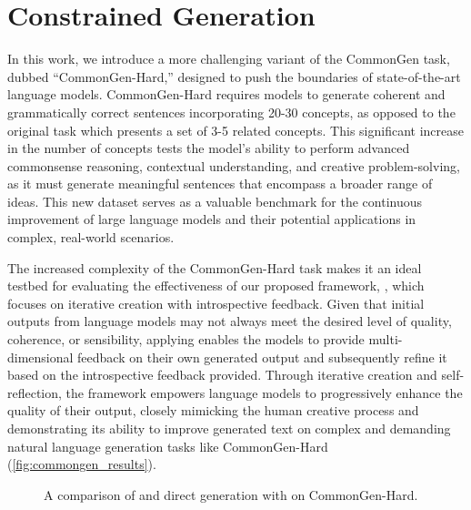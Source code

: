 \section{Constrained Generation}
\label{section:constrainedgen}

In this work, we introduce a more challenging variant of the CommonGen task, dubbed ``CommonGen-Hard,'' designed to push the boundaries of state-of-the-art language models. CommonGen-Hard requires models to generate coherent and grammatically correct sentences incorporating 20-30 concepts, as opposed to the original task which presents a set of 3-5 related concepts. This significant increase in the number of concepts tests the model's ability to perform advanced commonsense reasoning, contextual understanding, and creative problem-solving, as it must generate meaningful sentences that encompass a broader range of ideas. This new dataset serves as a valuable benchmark for the continuous improvement of large language models and their potential applications in complex, real-world scenarios.

The increased complexity of the CommonGen-Hard task makes it an ideal testbed for evaluating the effectiveness of our proposed framework, \ours, which focuses on iterative creation with introspective feedback. Given that initial outputs from language models may not always meet the desired level of quality, coherence, or sensibility, applying \ours enables the models to provide multi-dimensional feedback on their own generated output and subsequently refine it based on the introspective feedback provided. Through iterative creation and self-reflection, the \ours framework empowers language models to progressively enhance the quality of their output, closely mimicking the human creative process and demonstrating its ability to improve generated text on complex and demanding natural language generation tasks like CommonGen-Hard (\autoref{fig:commongen_results}).

\begin{figure}
\centering
{}
\caption{A comparison of \ours and direct generation with \gptt on CommonGen-Hard.}
\label{fig:commongen_results}
\end{figure}